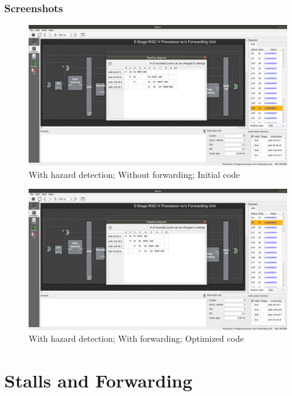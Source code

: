 \documentclass[12pt, fleqn]{article}
\begin{document}
\subsubsection*{Screenshots}
\begin{figure}[H]
  \centering
  \includegraphics[scale=0.25]{Q2/b_init_hnf_end_pipeline.png}
  \caption{With hazard detection; Without forwarding; Initial code}
\end{figure}
\begin{figure}[H]
  \centering
  \includegraphics[scale=0.25]{Q2/b_opt_hnf_end_pipeline.png}
  \caption{With hazard detection; With forwarding; Optimized code}
\end{figure}


\newpage
\section{Stalls and Forwarding}
\end{document}

